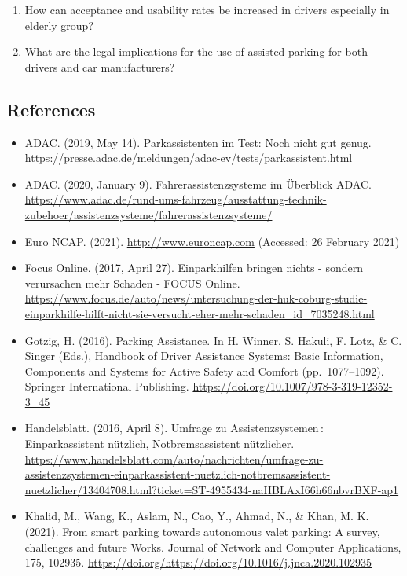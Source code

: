 \documentclass[
]{book}
\providecommand{\tightlist}{%
  \setlength{\itemsep}{0pt}\setlength{\parskip}{0pt}}
\begin{document}
\begin{enumerate}
\def\labelenumi{\arabic{enumi}.}
\tightlist
\item
  How can acceptance and usability rates be increased in drivers especially in elderly group?
\item
  What are the legal implications for the use of assisted parking for both drivers and car manufacturers?
\end{enumerate}

\hypertarget{references-24}{%
\subsection*{References}\label{references-24}}

\begin{itemize}
\tightlist
\item
  ADAC. (2019, May 14). Parkassistenten im Test: Noch nicht gut genug. \url{https://presse.adac.de/meldungen/adac-ev/tests/parkassistent.html}
\item
  ADAC. (2020, January 9). Fahrerassistenzsysteme im Überblick \textbar{} ADAC. \url{https://www.adac.de/rund-ums-fahrzeug/ausstattung-technik-zubehoer/assistenzsysteme/fahrerassistenzsysteme/}
\item
  Euro NCAP. (2021). \url{http://www.euroncap.com} (Accessed: 26 February 2021)
\item
  Focus Online. (2017, April 27). Einparkhilfen bringen nichts - sondern verursachen mehr Schaden - FOCUS Online. \url{https://www.focus.de/auto/news/untersuchung-der-huk-coburg-studie-einparkhilfe-hilft-nicht-sie-versucht-eher-mehr-schaden_id_7035248.html}
\item
  Gotzig, H. (2016). Parking Assistance. In H. Winner, S. Hakuli, F. Lotz, \& C. Singer (Eds.), Handbook of Driver Assistance Systems: Basic Information, Components and Systems for Active Safety and Comfort (pp.~1077--1092). Springer International Publishing. \url{https://doi.org/10.1007/978-3-319-12352-3_45}
\item
  Handelsblatt. (2016, April 8). Umfrage zu Assistenzsystemen\,: Einparkassistent nützlich, Notbremsassistent nützlicher. \url{https://www.handelsblatt.com/auto/nachrichten/umfrage-zu-assistenzsystemen-einparkassistent-nuetzlich-notbremsassistent-nuetzlicher/13404708.html?ticket=ST-4955434-naHBLAxI66h66nbvrBXF-ap1}
\item
  Khalid, M., Wang, K., Aslam, N., Cao, Y., Ahmad, N., \& Khan, M. K. (2021). From smart parking towards autonomous valet parking: A survey, challenges and future Works. Journal of Network and Computer Applications, 175, 102935. \url{https://doi.org/https://doi.org/10.1016/j.jnca.2020.102935}

\end{itemize}
\end{document}
